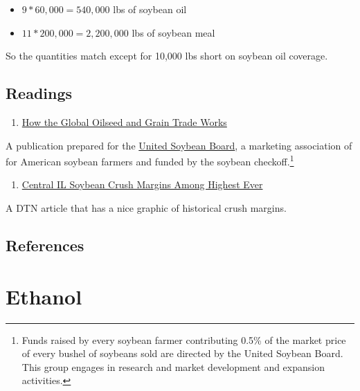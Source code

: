 \documentclass[]{book}
\providecommand{\tightlist}{%
  \setlength{\itemsep}{0pt}\setlength{\parskip}{0pt}}
\let\rmarkdownfootnote\footnote%
\def\footnote{\protect\rmarkdownfootnote}
\theoremstyle{definition}
\theoremstyle{definition}
\theoremstyle{remark}
\begin{document}
\begin{itemize}
\tightlist
\item
  \(9*60,000 = 540,000\) lbs of soybean oil
\item
  \(11*200,000 = 2,200,000\) lbs of soybean meal
\end{itemize}

So the quantities match except for 10,000 lbs short on soybean oil
coverage.

\section{Readings}\label{readings-4}

\begin{enumerate}
\def\labelenumi{\arabic{enumi}.}
\tightlist
\item
  \href{http://unitedsoybean.org/wp-content/uploads/2013/07/RevisedJan12_GlobalOilSeedGrainTrade_2011.pdf}{How
  the Global Oilseed and Grain Trade Works}
\end{enumerate}

A publication prepared for the \href{http://unitedsoybean.org/}{United
Soybean Board}, a marketing association of for American soybean farmers
and funded by the soybean checkoff.\footnote{Funds raised by every
  soybean farmer contributing 0.5\% of the market price of every bushel
  of soybeans sold are directed by the United Soybean Board. This group
  engages in research and market development and expansion activities.}

\begin{enumerate}
\def\labelenumi{\arabic{enumi}.}
\setcounter{enumi}{1}
\tightlist
\item
  \href{http://www.dtnprogressivefarmer.com/dtnag/common/link.do;jsessionid=CA98693F5E3C9EF37EC1F032464A6388.agfreejvm1?symbolicName=/ag/blogs/template1\&blogHandle=agfundamental\&blogEntryId=8a82c0bc372e8fba0137a8324dd704cf}{Central
  IL Soybean Crush Margins Among Highest Ever}
\end{enumerate}

A DTN article that has a nice graphic of historical crush margins.

\section{References}\label{references-1}

\chapter{Ethanol}\label{ethanol}
\end{document}
